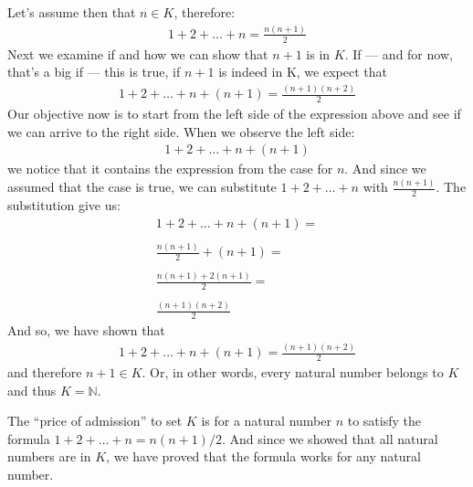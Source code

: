 \documentclass[letterpaper,10pt,english]{sphinxmanual}
\begin{document}
Let’s assume then that \(n\in K\), therefore:
\begin{equation*}
\begin{split}1+2+\ldots + n = \frac{n(n+1)}{2}\end{split}
\end{equation*}
Next we examine if and how we can show that \(n+1\) is in \(K\). If — and for now, that’s a big if — this is true, if \(n+1\) is indeed in K, we expect that
\begin{equation*}
\begin{split}1+2+\dots + n +(n+1) = \frac{(n+1)(n+2)}{2}\end{split}
\end{equation*}
Our objective now is to start from the left side of the expression above and see if we can arrive to the right side. When we observe the left side:
\begin{equation*}
\begin{split}1+2+\dots + n +(n+1)\end{split}
\end{equation*}
we notice that it contains the expression from the case for \(n\). And since we assumed that the case is true, we can substitute \(1+2+\ldots + n\) with \(\frac{n(n+1)}{2}\). The substitution give us:
\begin{equation*}
\begin{split}1+2+\dots + n +(n+1) =\\ \\
\frac{n(n+1)}{2} + (n+1) = \\ \\
\frac{n(n+1)+2(n+1)}{2} = \\ \\
\frac{(n+1)(n+2)}{2}\end{split}
\end{equation*}
And so, we have shown that
\begin{equation*}
\begin{split}1+2+\dots + n +(n+1) = \frac{(n+1)(n+2)}{2}\end{split}
\end{equation*}
and therefore \(n+1\in K\). Or, in other words, every natural number belongs to \(K\) and thus \(K=\mathbb{N}\).

The “price of admission” to set \(K\) is for a natural number \(n\) to satisfy the formula \(1+2+\ldots + n = n(n+1)/2\). And since we showed that all natural numbers are in \(K\), we have proved that the formula works for any natural number.
\end{document}
